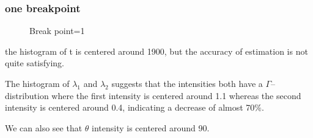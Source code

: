 \documentclass{article}
\begin{document}
\subsubsection{one breakpoint}
\begin{figure}[H]
    \centering
    \caption{Break point=1}
\end{figure}

the histogram of t is centered around 1900, but the accuracy of estimation is not quite satisfying.

The histogram of $\lambda_1$ and $\lambda_2$ suggests that the intensities both have a $\Gamma$–distribution where the first intensity is centered around 1.1 whereas the second intensity is centered around 0.4, indicating a decrease of almost 70$\%$.

We can also see that $\theta$ intensity is centered around 90.
\end{document}
